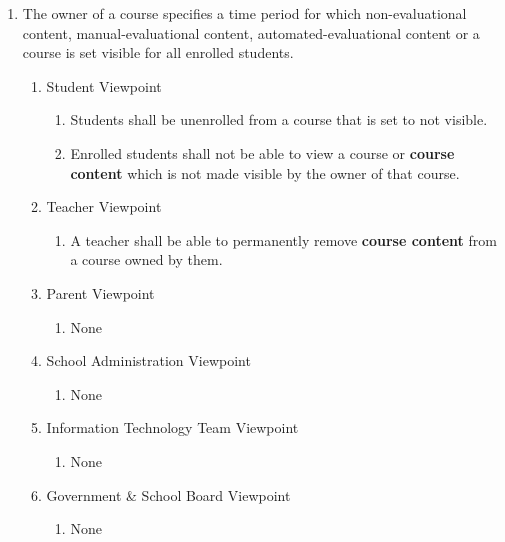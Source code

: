 \documentclass[]{article}
\begin{document}
\begin{enumerate}[{BE}1.]
	\item The owner of a course specifies a time period for which non-evaluational
content, manual-evaluational content, automated-evaluational content or a course
is set visible for all enrolled students.
	\begin{enumerate}[{VP2}.1]
		\item Student Viewpoint
			\begin{enumerate}
        \item Students shall be unenrolled from a course that is set to not
          visible.
        \item Enrolled students shall not be able to view a course or
          \textbf{course content} which is not made visible by the owner of
          that course.
			\end{enumerate}
		\item Teacher Viewpoint
			\begin{enumerate}
        \item A teacher shall be able to permanently remove \textbf{course
          content} from a course owned by them.
			\end{enumerate}
		\item Parent Viewpoint
			\begin{enumerate}
				\item None
			\end{enumerate}
		\item School Administration Viewpoint
			\begin{enumerate}
				\item None
			\end{enumerate}
		\item Information Technology Team Viewpoint
			\begin{enumerate}
				\item None
			\end{enumerate}
		\item Government \& School Board Viewpoint
			\begin{enumerate}
				\item None
			\end{enumerate}
	\end{enumerate}



\end{enumerate}
\end{document}
